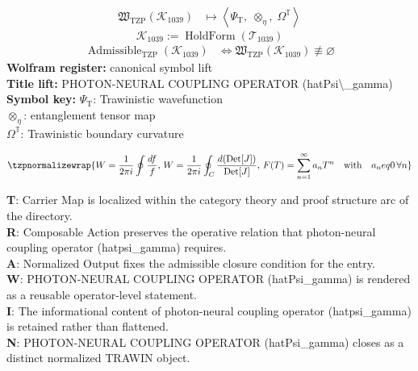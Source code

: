 \noindent
\begin{minipage}[t]{0.48\linewidth}
\begingroup
\small
\[
\begin{aligned}
\mathfrak{W}_{\mathrm{TZP}}\!\left(\mathcal{K}_{1039}\right)
&\longmapsto
\left\langle \Psi_{\mathrm{T}},\; \otimes_{\eta},\; \Omega^{\mathbb{T}} \right\rangle
\end{aligned}
\]
\[
\mathcal{K}_{1039}
:=
\operatorname{HoldForm}\!\left(\mathcal{T}_{1039}\right)
\]
\[
\begin{aligned}
\operatorname{Admissible}_{\mathrm{TZP}}\!\left(\mathcal{K}_{1039}\right)
&\Longleftrightarrow
\mathfrak{W}_{\mathrm{TZP}}\!\left(\mathcal{K}_{1039}\right)\not\equiv\varnothing
\end{aligned}
\]
\textbf{Wolfram register:} canonical symbol lift\\
\textbf{Title lift:} PHOTON-NEURAL COUPLING OPERATOR (hatPsi\textbackslash{}\_gamma)\\
\textbf{Symbol key:} \(\Psi_{\mathrm{T}}\): Trawinistic wavefunction\\ \(\otimes_{\eta}\): entanglement tensor map\\ \(\Omega^{\mathbb{T}}\): Trawinistic boundary curvature
\par
\endgroup
\end{minipage}\hfill
\begin{minipage}[t]{0.48\linewidth}
\[
\tzpnormalizewrap{W = \frac{1}{2\pi i} \oint \frac{df}{f},\,W = \frac{1}{2\pi i} \oint_C \frac{d({\rm Det}[J])}{{\rm Det}[J]},\,F(T) = \sum_{n=1}^{\infty} a_n T^n \quad \text{with} \quad a_n  eq 0 \, \forall n}
\]

\small
\textbf{T}: Carrier Map is localized within the category theory and proof structure arc of the directory.\\
\textbf{R}: Composable Action preserves the operative relation that photon-neural coupling operator (hatpsi\_gamma) requires.\\
\textbf{A}: Normalized Output fixes the admissible closure condition for the entry.\\
\textbf{W}: PHOTON-NEURAL COUPLING OPERATOR (hatPsi\_gamma) is rendered as a reusable operator-level statement.\\
\textbf{I}: The informational content of photon-neural coupling operator (hatpsi\_gamma) is retained rather than flattened.\\
\textbf{N}: PHOTON-NEURAL COUPLING OPERATOR (hatPsi\_gamma) closes as a distinct normalized TRAWIN object.
\normalsize
\end{minipage}

